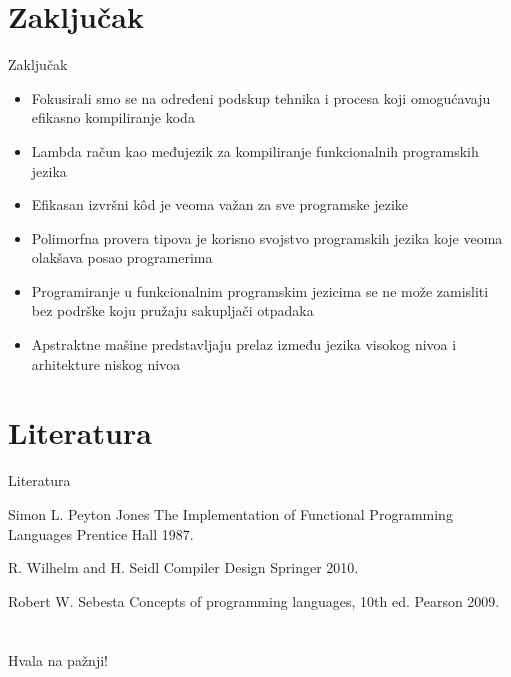 \documentclass[xcolor={dvipsnames}, 11pt]{beamer}
\begin{document}
\section{Zaključak}
\begin{frame}{Zaključak}
	\begin{itemize}
		\item Fokusirali smo se na određeni podskup tehnika i procesa koji omogućavaju efikasno
		kompiliranje koda
		\item Lambda račun kao međujezik za kompiliranje funkcionalnih programskih jezika
		\item Efikasan izvršni k\^ od je veoma važan za sve programske jezike
		\item Polimorfna provera tipova je korisno svojstvo programskih jezika koje veoma olakšava posao programerima
		\item Programiranje u funkcionalnim programskim jezicima se ne može zamisliti bez podrške koju pružaju sakupljači otpadaka 
		\item Apstraktne mašine predstavljaju prelaz između jezika visokog nivoa i arhitekture niskog nivoa
	\end{itemize}
\end{frame}


\section{Literatura}
\begin{frame}{Literatura}
	
	\begin{thebibliography}{10}
		
		\beamertemplatearticlebibitems
		\bibitem{}
			Simon L. Peyton Jones
			\newblock The Implementation of Functional Programming Languages	
			\newblock Prentice Hall 1987.
		
		\beamertemplatearticlebibitems
		\bibitem{}
			R. Wilhelm and H. Seidl
			\newblock Compiler Design
			\newblock Springer 2010.
		
		\beamertemplatearticlebibitems
		\bibitem{}
			Robert W. Sebesta 
			\newblock Concepts of programming languages, 10th ed.
			\newblock Pearson 2009.
			
	\end{thebibliography}
\end{frame}

\section{}
\begin{frame}
	\centering \Large Hvala na pažnji!
\end{frame}
	
	
\end{document}
